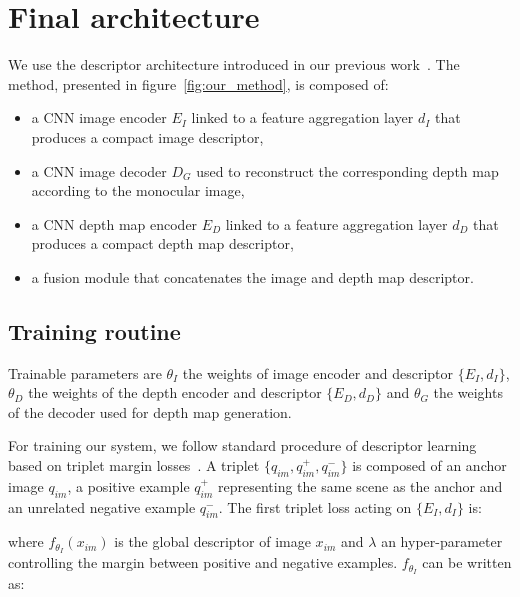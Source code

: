 \section{Final architecture}
\label{sec:method}


%

We use the descriptor architecture introduced in our previous work~\cite{Piasco2019}. The method, presented in figure~\ref{fig:our_method}, is composed of:

\begin{itemize}
	\item a CNN image encoder $E_I$ linked to a feature aggregation layer $d_I$ that produces a compact image descriptor,
	\item a CNN image decoder $D_G$ used to reconstruct the corresponding depth map according to the monocular image,
	\item a CNN depth map encoder $E_D$ linked to a feature aggregation layer $d_D$ that produces a compact depth map descriptor,
	\item a fusion module that concatenates the image and depth map descriptor.
\end{itemize}

\subsection{Training routine}
\label{subsec:training}
Trainable parameters are $\theta_{I}$ the weights of image encoder and descriptor $\{E_I, d_I\}$, $\theta_{D}$ the weights of the depth encoder and descriptor $\{E_D, d_D\}$ and $\theta_{G}$ the weights of the decoder used for depth map generation. 

For training our system, we follow standard procedure of descriptor learning based on triplet margin losses~\cite{Arandjelovic2017}. A triplet $\{q_{im}, q_{im}^+, q_{im}^-\}$ is composed of an anchor image $q_{im}$, a positive example $q_{im}^+$ representing the same scene as the anchor and an unrelated negative example $q_{im}^-$.
The first triplet loss acting on $\{E_I, d_I\}$ is:


where $f_{\theta_{I}}(x_{im})$ is the global descriptor of image $x_{im}$ and $\lambda$ an hyper-parameter controlling the margin between positive and negative examples. $f_{\theta_{I}}$ can be written as:

